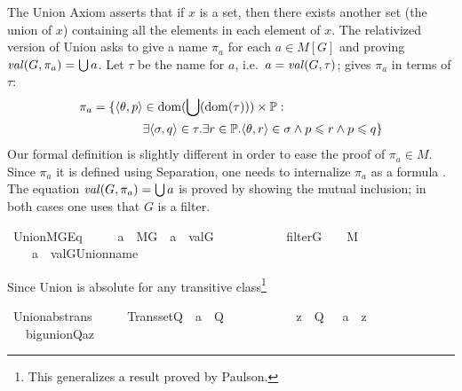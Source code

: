 The Union Axiom asserts that if $x$ is a set, then there exists
another set (the union of $x$) containing all the elements in each
element of $x$. The relativized version of Union asks to give a name
$\pi_a$ for each $a\in M[G]$ and proving $\operatorname{\mathit{val}}(G,\pi_a)=\bigcup a$.
Let $\tau$ be the name for $a$, i.e.\ $a=\operatorname{\mathit{val}}(G,\tau)$; 
\citet{kunen2011set} gives $\pi_a$ in terms of $\tau$:
\begin{align*}
  \pi_a = \{\langle\theta,p \rangle &\in \operatorname{dom}(\bigcup(\operatorname{dom}(\tau))) \times \mathbb{P} : \\
&\exists \langle\sigma,q\rangle  \in \tau .
 \exists r \in \mathbb{P} . \langle \theta,r\rangle \in \sigma \wedge
    p\leqslant r \wedge p \leqslant q \}
\end{align*}
Our formal definition is slightly different in order to ease the proof of
$\pi_a \in M$.  Since $\pi_a$ it is defined using Separation, one
needs to internalize $\pi_a$ as a formula
. The
equation $\operatorname{\mathit{val}}(G,\pi_a)=\bigcup a$ is proved by showing the mutual
inclusion; in both cases one uses that $G$ is a filter.
\begin{isabelle}
  \isamarkupfalse%
\ Union{\isacharunderscore}MG{\isacharunderscore}Eq\ {\isacharcolon}\ \isanewline
\ \ \ {\isachardoublequoteopen}a\ {\isasymin}\ M{\isacharbrackleft}G{\isacharbrackright}{\isachardoublequoteclose}\ \ {\isachardoublequoteopen}a\ {\isacharequal}\ val{\isacharparenleft}G{\isacharcomma}{\isasymtau}{\isacharparenright}{\isachardoublequoteclose}\ \isanewline
\ \ \ \ \ \ \ \ \ \ {\isachardoublequoteopen}filter{\isacharparenleft}G{\isacharparenright}{\isachardoublequoteclose}\ \ {\isachardoublequoteopen}{\isasymtau}\ {\isasymin}\ M{\isachardoublequoteclose}\isanewline
\ \ \ {\isachardoublequoteopen}{\isasymUnion}\ a\ {\isacharequal}\ val{\isacharparenleft}G{\isacharcomma}Union{\isacharunderscore}name{\isacharparenleft}{\isasymtau}{\isacharparenright}{\isacharparenright}{\isachardoublequoteclose}
\end{isabelle}
Since Union is absolute for any transitive class\footnote{This
  generalizes a result proved by Paulson.}
\begin{isabelle}
\isamarkupfalse%
\ Union{\isacharunderscore}abs{\isacharunderscore}trans\ {\isacharcolon}\ \isanewline
\ \ \ {\isachardoublequoteopen}Transset{\isacharparenleft}Q{\isacharparenright}{\isachardoublequoteclose}\ \ {\isachardoublequoteopen}a\ {\isasymin}\ Q{\isachardoublequoteclose}\ \isanewline
\ \ \ \ \ \ \ \ \ \ {\isachardoublequoteopen}z\ {\isasymin}\ Q{\isachardoublequoteclose}\ \ {\isachardoublequoteopen}{\isasymUnion}\ a\ {\isacharequal}\ z{\isachardoublequoteclose}\isanewline
\ \ \ {\isachardoublequoteopen}big{\isacharunderscore}union{\isacharparenleft}{\isacharhash}{\isacharhash}Q{\isacharcomma}a{\isacharcomma}z{\isacharparenright}{\isachardoublequoteclose}
\end{isabelle}
